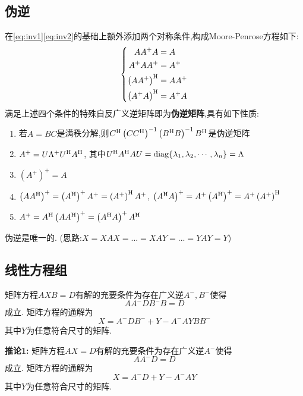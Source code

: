 \documentclass{matrix-review}
\makeatletter
\newcommand{\term}[1]{\textbf{#1}\index{A#1@#1}}
\makeatother
\begin{document}
\subsection{伪逆}
在\eqref{eq:inv1}\eqref{eq:inv2}的基础上额外添加两个对称条件,构成Moore-Penrose方程如下:\begin{equation}
    \left\{
    \begin{aligned}
        AA^+A                 & =A    \\ A^+AA^+&=A^+                \\
        \left(AA^+\right)^{\mathrm{H}} & =AA^+ \\ \left(A^+A\right)^{\mathrm{H}}&=A^+A
    \end{aligned}
    \right.
\end{equation}
满足上述四个条件的特殊自反广义逆矩阵即为\term{伪逆矩阵},具有如下性质:
\begin{enumerate}
    \item 若$A=BC$是满秩分解,则$C^{\mathrm{H}}\left(CC^{\mathrm{H}}\right)^{-1}\left(B^{\mathrm{H}} B\right)^{-1}B^{\mathrm{H}}$是伪逆矩阵 \important
    \item $A^+=U\Lambda^+U^{\mathrm{H}} A^{\mathrm{H}}$, 其中$U^{\mathrm{H}} A^{\mathrm{H}} AU=\mathrm{diag}\{\lambda_1,\lambda_2,\cdots,\lambda_n\}=\Lambda$
    \item $\left(A^+\right)^+=A$
    \item $\left(AA^{\mathrm{H}}\right)^+=\left(A^{\mathrm{H}}\right)^+A^+=\left(A^+\right)^{\mathrm{H}} A^+$, $\left(A^{\mathrm{H}} A\right)^+=A^+\left(A^{\mathrm{H}}\right)^+=A^+\left(A^+\right)^{\mathrm{H}} $
    \item $A^+=A^{\mathrm{H}}\left(AA^{\mathrm{H}}\right)^+=\left(A^{\mathrm{H}} A\right)^+A^{\mathrm{H}}$
\end{enumerate}
\begin{remarkbox}
    伪逆是唯一的. (思路:$X=XAX=...=XAY=...=YAY=Y$)
\end{remarkbox}

\subsection{线性方程组}
矩阵方程$AXB=D$有解的充要条件为存在广义逆$A^-,B^-$使得\begin{equation}
    AA^-DB^-B=D
\end{equation}成立. 矩阵方程的通解为\begin{equation}
    X=A^-DB^-+Y-A^-AYBB^-
\end{equation}其中$Y$为任意符合尺寸的矩阵.

\textbf{推论1:} 矩阵方程$AX=D$有解的充要条件为存在广义逆$A^-$使得\begin{equation}
    AA^-D=D
\end{equation}成立. 矩阵方程的通解为\begin{equation}
    X=A^-D+Y-A^-AY
\end{equation}其中$Y$为任意符合尺寸的矩阵.
\end{document}
